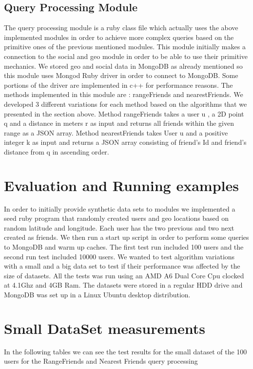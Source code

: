 \documentclass[prodmode,acmtods]{acmsmall} %
\begin{document}
\subsection{Query Processing Module}
The query processing module is a ruby class file which actually uses the above implemented modules in order to achieve more complex queries based on the primitive ones of the previous mentioned modules.
This module initially makes a connection to the social and geo module in order to be able to use their primitive mechanics. We stored geo and social data in MongoDB as already mentioned so this module uses Mongod Ruby driver in order to connect to MongoDB. Some portions of the driver are implemented in c++ for performance reasons. The methods implemented in this module are : rangeFriends and nearestFriends. We developed 3 different variations for each method based on the algorithms that we presented in the section above.
Method rangeFriends takes a user u , a 2D point q and a distance in meters r as input and returns all friends within the given range as a JSON array.
Method nearestFriends takes User u and a positive integer k as input and returns a JSON array consisting of friend's Id and friend's distance from q in ascending order.



\section{Evaluation and Running examples}
In order to initially provide synthetic data sets to modules we implemented a seed ruby program that randomly created users and geo locations based on random latitude and longitude. Each user has the two previous and two next created as friends. We then run a start up script in order to perform some queries to MongoDB and warm up caches. The first test run included 100 users and the second run test included 10000 users. We wanted to test algorithm variations with a small and a big data set to test if their performance was affected by the size of datasets. All the tests was run using an AMD A6 Dual Core Cpu clocked at 4.1Ghz and 4GB Ram. The datasets were stored in a regular HDD drive and MongoDB was set up in a Linux Ubuntu desktop distribution.

\section{Small DataSet measurements}
In the following tables we can see the test results for the small dataset of the 100 users
for the RangeFriends and Nearest Friends query processing
\newline
\end{document}
